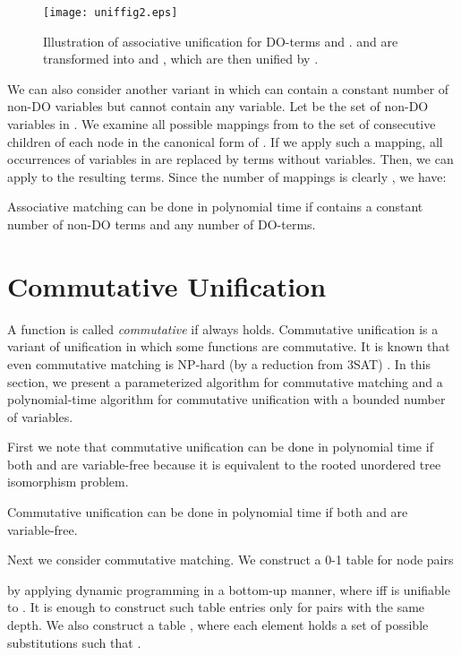 \documentclass[a4paper]{llncs}
\begin{document}
\begin{figure}[ht]
\begin{center}
\texttt{[image: uniffig2.eps]}
\caption{Illustration of associative unification for DO-terms  and .
 and  are transformed into  and ,
which are then unified by
.}
\label{fig:asopoly}
\end{center}
\end{figure}

We can also consider another variant in which
 can contain a constant number of non-DO variables
but  cannot contain any variable.
Let  be the set of non-DO variables in .
We examine all possible mappings from  to the set of
consecutive children of each node in the canonical form  of .
If we apply such a mapping, all occurrences of variables in 
are replaced by terms without variables.
Then, we can apply  to the resulting terms.
Since the number of mappings is clearly ,
we have:

\begin{corollary}
Associative matching can be done in polynomial time 
if  contains a constant number of non-DO terms and
any number of DO-terms.
\label{cor:asspoly}
\end{corollary}


\section{Commutative Unification}

A function  is called \emph{commutative} if
 always holds.
Commutative unification is a variant of unification
in which some functions are commutative.
It is known that 
even commutative matching
is NP-hard (by a reduction from 3SAT) \cite{benanav87}.
In this section,
we present a parameterized algorithm for commutative matching
and a polynomial-time algorithm for commutative unification
with a bounded number of variables.

First we note that commutative unification can be done in polynomial time
if both  and  are variable-free because it is equivalent to
the rooted unordered tree isomorphism problem.

\begin{proposition}
Commutative unification can be done in polynomial time
if both  and  are variable-free.
\end{proposition}

Next we consider commutative matching.
We construct a 0-1 table  for node pairs

by applying dynamic programming in a bottom-up manner,
where  iff  is unifiable to .
It is enough to construct such table entries only for pairs
with the same depth.
We also construct a table , where each element
holds a set of possible substitutions 
such that .
\end{document}
